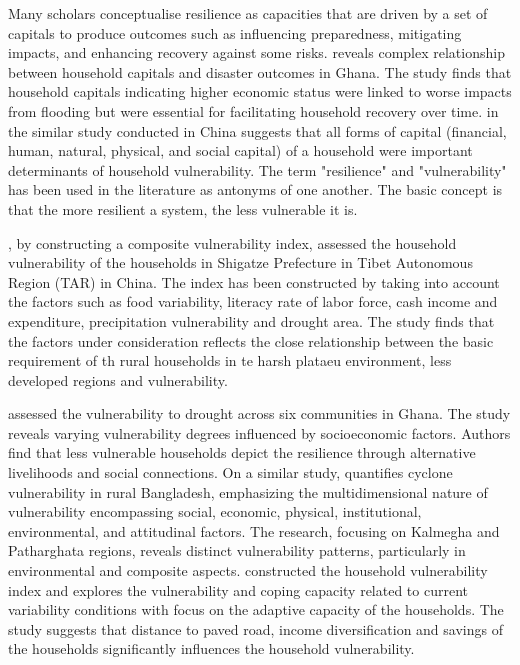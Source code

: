 Many scholars conceptualise resilience as capacities that are driven by a set of capitals to produce outcomes such as influencing preparedness, mitigating impacts, and enhancing recovery against some risks. \cite{gaisie2021complexity} reveals complex relationship between household capitals and disaster outcomes in Ghana. The study finds that household capitals indicating higher economic status were linked to worse impacts from flooding but were essential for facilitating household recovery over time. \cite{zhang2020capital} in the similar study conducted in China suggests that all forms of capital (financial, human, natural, physical, and social 
capital) of a household were important determinants of household vulnerability. The term "resilience" and "vulnerability" has been used in the literature as antonyms of one another. The basic concept is that the more resilient a system, the less vulnerable it is.\par 

\cite{fang2016rural}, by constructing a composite vulnerability index, assessed the household vulnerability of the households in Shigatze Prefecture in Tibet
Autonomous Region (TAR) in China. The index has been constructed by taking into account the factors such as food variability, literacy rate of labor force, cash income and expenditure, precipitation vulnerability and drought area. The study finds that the factors under consideration reflects the close relationship between the basic requirement of th rural households in te harsh plataeu environment, less developed regions and vulnerability.\par    

\cite{antwi2013characterising} assessed the vulnerability to drought across six communities in Ghana. The study reveals varying vulnerability degrees influenced by socioeconomic factors. Authors find that less vulnerable households depict the resilience through alternative livelihoods and social connections. On a similar study, \cite{rahman2023households} quantifies cyclone vulnerability in rural Bangladesh, emphasizing  the multidimensional nature of vulnerability encompassing social, economic, physical, institutional, environmental, and attitudinal factors. The research, focusing on Kalmegha and Patharghata regions, reveals distinct vulnerability patterns, particularly in environmental and composite aspects. \cite{notenbaert2013derivation} constructed the household vulnerability index and explores the vulnerability and coping capacity related to current variability conditions with  focus on the adaptive capacity of the households. The study suggests that distance to paved road, income diversification and savings of the households significantly influences the household vulnerability.\par
